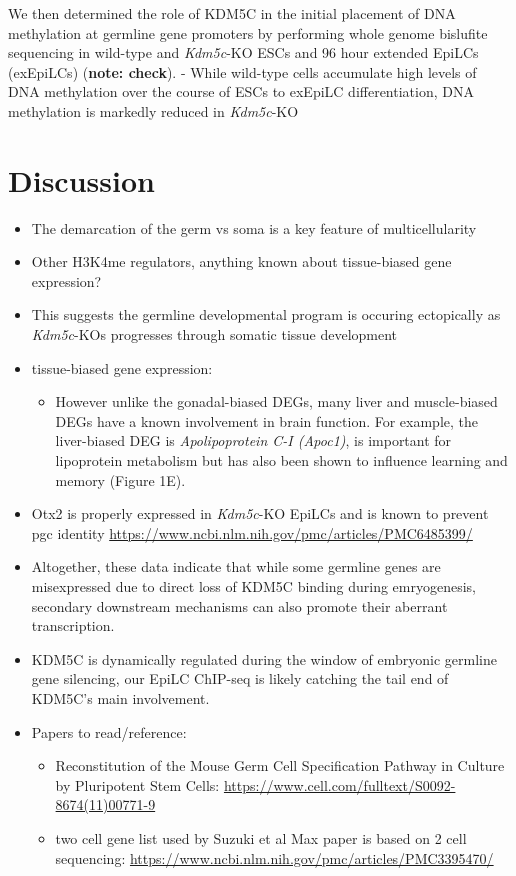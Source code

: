 \documentclass[
]{article}
\providecommand{\tightlist}{%
  \setlength{\itemsep}{0pt}\setlength{\parskip}{0pt}}
\begin{document}
We then determined the role of KDM5C in the initial placement of DNA
methylation at germline gene promoters by performing whole genome
bislufite sequencing in wild-type and \emph{Kdm5c}-KO ESCs and 96 hour
extended EpiLCs (exEpiLCs) (\textbf{note: check}). - While wild-type
cells accumulate high levels of DNA methylation over the course of ESCs
to exEpiLC differentiation, DNA methylation is markedly reduced in
\emph{Kdm5c}-KO

\hypertarget{discussion}{%
\section{Discussion}\label{discussion}}

\begin{itemize}
\item
  The demarcation of the germ vs soma is a key feature of
  multicellularity
\item
  Other H3K4me regulators, anything known about tissue-biased gene
  expression?
\item
  This suggests the germline developmental program is occuring
  ectopically as \emph{Kdm5c}-KOs progresses through somatic tissue
  development
\item
  tissue-biased gene expression:

  \begin{itemize}
  \tightlist
  \item
    However unlike the gonadal-biased DEGs, many liver and muscle-biased
    DEGs have a known involvement in brain function. For example, the
    liver-biased DEG is \emph{Apolipoprotein C-I (Apoc1)}, is important
    for lipoprotein metabolism but has also been shown to influence
    learning and memory (Figure 1E).
  \end{itemize}
\item
  Otx2 is properly expressed in \emph{Kdm5c}-KO EpiLCs and is known to
  prevent pgc identity
  \url{https://www.ncbi.nlm.nih.gov/pmc/articles/PMC6485399/}
\item
  Altogether, these data indicate that while some germline genes are
  misexpressed due to direct loss of KDM5C binding during emryogenesis,
  secondary downstream mechanisms can also promote their aberrant
  transcription.
\item
  KDM5C is dynamically regulated during the window of embryonic germline
  gene silencing, our EpiLC ChIP-seq is likely catching the tail end of
  KDM5C's main involvement.
\item
  Papers to read/reference:

  \begin{itemize}
  \tightlist
  \item
    Reconstitution of the Mouse Germ Cell Specification Pathway in
    Culture by Pluripotent Stem Cells:
    \url{https://www.cell.com/fulltext/S0092-8674(11)00771-9}
  \item
    two cell gene list used by Suzuki et al Max paper is based on 2 cell
    sequencing:
    \url{https://www.ncbi.nlm.nih.gov/pmc/articles/PMC3395470/}
  \end{itemize}
\end{itemize}
\end{document}
